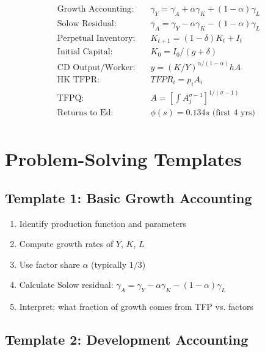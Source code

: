 \documentclass[a4paper,11pt]{article}
\newcommand{\gammay}{\gamma_Y}
\newcommand{\gammaA}{\gamma_A}
\newcommand\gammaK{\gamma_K}
\newcommand\gammaL{\gamma_L}
\newcommand{\tfpr}{TFPR}
\begin{document}
\begin{resultbox}
\begin{align*}
\text{Growth Accounting:} & \quad \gammay = \gammaA + \alpha\gammaK + (1-\alpha)\gammaL \\
\text{Solow Residual:} & \quad \gammaA = \gammay - \alpha\gammaK - (1-\alpha)\gammaL \\
\text{Perpetual Inventory:} & \quad K_{t+1} = (1-\delta)K_t + I_t \\
\text{Initial Capital:} & \quad K_0 = I_0/(g+\delta) \\
\text{CD Output/Worker:} & \quad y = (K/Y)^{\alpha/(1-\alpha)} h A \\
\text{HK TFPR:} & \quad \tfpr_i = p_i A_i \\
\text{TFPQ:} & \quad A = \left[\int A_j^{\sigma-1}\right]^{1/(\sigma-1)} \\
\text{Returns to Ed:} & \quad \phi(s) = 0.134s \text{ (first 4 yrs)} \\
\end{align*}
\end{resultbox}

\section{Problem-Solving Templates}

\subsection*{Template 1: Basic Growth Accounting}

\begin{enumerate}
    \item Identify production function and parameters
    \item Compute growth rates of $Y$, $K$, $L$
    \item Use factor share $\alpha$ (typically $1/3$)
    \item Calculate Solow residual: $\gammaA = \gammay - \alpha\gammaK - (1-\alpha)\gammaL$
    \item Interpret: what fraction of growth comes from TFP vs. factors
\end{enumerate}

\subsection*{Template 2: Development Accounting}
\end{document}
